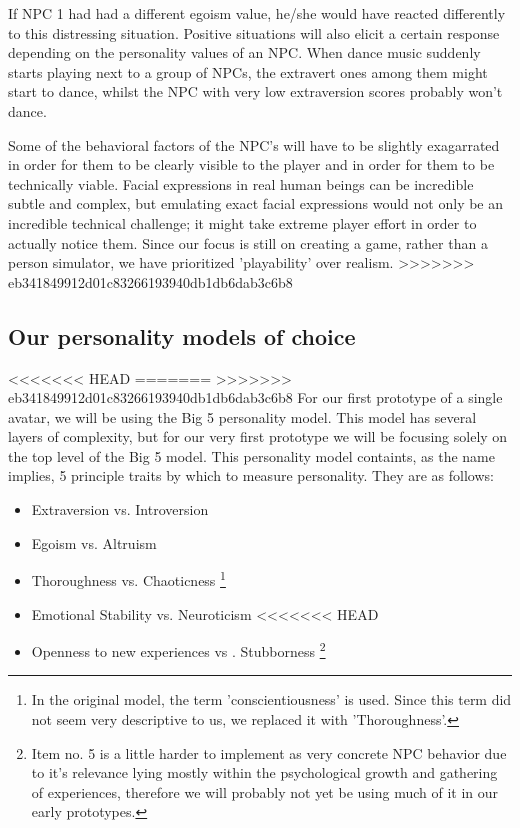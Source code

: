 \documentclass{article}
\begin{document}
  If NPC 1 had had a different egoism value, he/she would have reacted differently to this distressing situation. Positive situations will also elicit a certain response depending on the personality values of an NPC. When dance music suddenly starts playing next to a group of NPCs, the extravert ones among them might start to dance, whilst the NPC with very low extraversion scores probably won't dance. 

  Some of the behavioral factors of the NPC's will have to be slightly exagarrated in order for them to be clearly visible to the player and in order for them to be technically viable. Facial expressions in real human beings can be incredible subtle and complex, but emulating exact facial expressions would not only be an incredible technical challenge; it might take extreme player effort in order to actually notice them. Since our focus is still on creating a game, rather than a person simulator, we have prioritized 'playability' over realism.
>>>>>>> eb341849912d01c83266193940db1db6dab3c6b8


  \newpage
  \subsection{Our personality models of choice}
<<<<<<< HEAD
=======
>>>>>>> eb341849912d01c83266193940db1db6dab3c6b8
   For our first prototype of a single avatar, we will be using the Big 5 personality model. This model has several layers of complexity, but for our very first prototype we will be focusing solely on the top level of the Big 5 model. This personality model containts, as the name implies, 5 principle traits by which to measure personality. They are as follows:

   \begin{itemize}
   	\item Extraversion vs. Introversion
   	\item Egoism vs. Altruism
   	\item Thoroughness vs. Chaoticness \footnote{In the original model, the term 'conscientiousness' is used. Since this term did not seem very descriptive to us, we replaced it with 'Thoroughness'.}
   	\item Emotional Stability vs. Neuroticism 
<<<<<<< HEAD
   	\item Openness to new experiences vs . Stubborness \footnote{Item no. 5 is a little harder to implement as very concrete NPC behavior due to it's relevance lying mostly within the psychological growth and gathering of experiences, therefore we will probably not yet be using much of it in our early prototypes.}
   \end{itemize}
\end{document}
